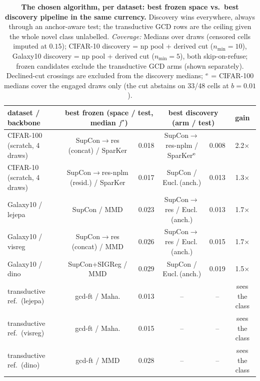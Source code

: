 \begin{table}[t]
\centering
\footnotesize
\begin{tabular}{lccccc}
\toprule
dataset / backbone & \multicolumn{2}{c}{best frozen (space / test, median $f^\star$)} & \multicolumn{2}{c}{best discovery (arm / test)} & gain \\
\midrule
CIFAR-100 (scratch, 4 draws) & SupCon$\to$res (concat) / SparKer & 0.018 & SupCon$\to$res-nplm / SparKer$^{\rm e}$ & 0.008 & 2.2$\times$ \\
CIFAR-10 (scratch, 4 draws) & SupCon$\to$res-nplm (resid.) / SparKer & 0.017 & SupCon / Eucl.\,(anch.) & 0.013 & 1.3$\times$ \\
Galaxy10 / lejepa & SupCon / MMD & 0.023 & SupCon$\to$res / Eucl.\,(anch.) & 0.013 & 1.7$\times$ \\
Galaxy10 / visreg & SupCon$\to$res (concat) / MMD & 0.026 & SupCon$\to$res / Eucl.\,(anch.) & 0.015 & 1.7$\times$ \\
Galaxy10 / dino & SupCon+SIGReg / MMD & 0.029 & SupCon / Eucl.\,(anch.) & 0.019 & 1.5$\times$ \\
\addlinespace
\quad transductive ref.\ (lejepa) & gcd-ft / Maha. & 0.013 & -- & -- & sees the class \\
\quad transductive ref.\ (visreg) & gcd-ft / Maha. & 0.015 & -- & -- & sees the class \\
\quad transductive ref.\ (dino) & gcd-ft / MMD & 0.028 & -- & -- & sees the class \\
\bottomrule
\end{tabular}
\caption{\textbf{The chosen algorithm, per dataset: best frozen space vs.\ best discovery pipeline in the same currency.}  Discovery wins everywhere, always through an anchor-aware test; the transductive GCD rows are the ceiling given the whole novel class unlabelled. \emph{Coverage:} Medians over draws (censored cells imputed at $0.15$); CIFAR-10 discovery = np pool + derived cut ($n_{\min}{=}10$), Galaxy10 discovery = np pool + derived cut ($n_{\min}{=}5$), both skip-on-refuse; frozen candidates exclude the transductive GCD arms (shown separately).  Declined-cut crossings are excluded from the discovery medians; $^{\rm e}$ = CIFAR-100 medians cover the engaged draws only (the cut abstains on 33/48 cells at $b{=}0.01$).}
\label{tab:sigma_best}
\end{table}
